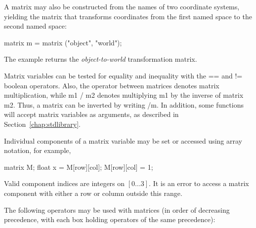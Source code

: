 \documentclass[11pt,letterpaper]{book}
\begin{document}
A matrix may also be constructed from the names of two coordinate
systems, yielding the matrix that transforms coordinates from the
first named space to the second named space:

\begin{code}
    matrix m = matrix ("object", "world");
\end{code}

\noindent The example returns the \emph{object-to-world} transformation
matrix.

Matrix variables can be tested for equality and inequality with the
{\cf ==} and {\cf !=} boolean operators.  Also, the {\cf *} operator
between matrices denotes matrix multiplication, while {\cf m1 / m2}
denotes multiplying {\cf m1} by the inverse of matrix {\cf m2}.  Thus,
a matrix can be inverted by writing {/m}.  In addition, some
functions will accept matrix variables as arguments, as described in
Section~\ref{chap:stdlibrary}.

Individual components of a matrix variable may be set or accessed
using array notation, for example,

\begin{code}
    matrix M;
    float x = M[row][col];
    M[row][col] = 1;
\end{code}

Valid component indices are integers on $[0...3]$.  It is an error to
access a matrix component with either a row or column outside this
range.

The following operators may be used with matrices (in order of
decreasing precedence, with each box holding operators of the same
precedence):
\end{document}
